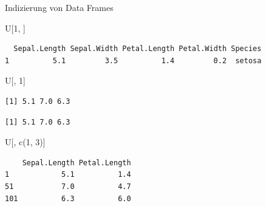 \documentclass[
  10pt,
  ignorenonframetext,
  aspectratio=169,
]{beamer}
\newenvironment{Shaded}{}{}
\newcommand{\DecValTok}[1]{\textcolor[rgb]{0.25,0.63,0.44}{#1}}
\newcommand{\FunctionTok}[1]{\textcolor[rgb]{0.02,0.16,0.49}{#1}}
\newcommand{\NormalTok}[1]{#1}
\newcommand{\SpecialCharTok}[1]{\textcolor[rgb]{0.25,0.44,0.63}{#1}}
\begin{document}
\begin{frame}[fragile]{Indizierung von Data Frames}
\label{indizierung-von-data-frames}
\begin{Shaded}
\begin{Highlighting}[]
\NormalTok{U[}\DecValTok{1}\NormalTok{, ]}
\end{Highlighting}
\end{Shaded}

\begin{verbatim}
  Sepal.Length Sepal.Width Petal.Length Petal.Width Species
1          5.1         3.5          1.4         0.2  setosa
\end{verbatim}

\begin{Shaded}
\begin{Highlighting}[]
\NormalTok{U[, }\DecValTok{1}\NormalTok{]}
\end{Highlighting}
\end{Shaded}

\begin{verbatim}
[1] 5.1 7.0 6.3
\end{verbatim}

\begin{Shaded}
\end{Shaded}

\begin{verbatim}
[1] 5.1 7.0 6.3
\end{verbatim}

\begin{Shaded}
\begin{Highlighting}[]
\NormalTok{U[, }\FunctionTok{c}\NormalTok{(}\DecValTok{1}\NormalTok{, }\DecValTok{3}\NormalTok{)]}
\end{Highlighting}
\end{Shaded}

\begin{verbatim}
    Sepal.Length Petal.Length
1            5.1          1.4
51           7.0          4.7
101          6.3          6.0
\end{verbatim}
\end{frame}
\end{document}
